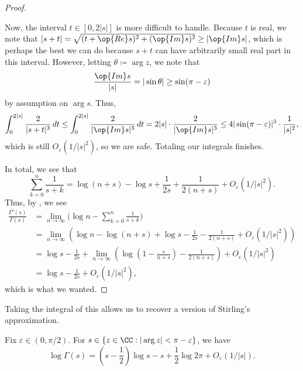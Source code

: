 \documentclass[../notes.tex]{subfiles}
\begin{document}
\begin{proof}
\begin{itemize}
		Now, the interval $t\in[0,2|s|]$ is more difficult to handle. Because $t$ is real, we note that $|s+t|=\sqrt{(t+\op{Re}s)^2+(\op{Im}s)^2}\ge|\op{Im}s|$, which is perhaps the best we can do because $s+t$ can have arbitrarily small real part in this interval. However, letting $\theta\coloneqq\arg z$, we note that
		\[\frac{\op{Im}s}{|s|}=|\sin\theta|\ge\sin(\pi-\varepsilon)\]
		by assumption on $\arg s$. Thus,
		\[\int_0^{2|s|}\frac2{|s+t|^3}\,dt\le\int_0^{2|s|}\frac2{|\op{Im}s|^3}\,dt=2|s|\cdot\frac2{|\op{Im}s|^3}\le4|\sin(\pi-\varepsilon)|^3\cdot\frac1{|s|^2},\]
		which is still $O_\varepsilon\left(1/|s|^2\right)$, so we are safe. Totaling our integrals finishes.
	\end{itemize}
	In total, we see that
	\[\sum_{k=0}^n\frac1{s+k}=\log(n+s)-\log s+\frac1{2s}+\frac1{2(n+s)}+O_\varepsilon\left(1/|s|^2\right).\]
	Thus, by , we see
	\begin{align*}
		\frac{\Gamma'(s)}{\Gamma(s)} &= \lim_{n\to\infty}\Bigg(\log n-\sum_{k=0}^n\frac1{s+k}\Bigg) \\
		&= \lim_{n\to\infty}\left(\log n-\log(n+s)+\log s-\frac1{2s}-\frac1{2(n+s)}+O_\varepsilon\left(1/|s|^2\right)\right) \\
		&= \log s-\frac1{2s}+\lim_{n\to\infty}\left(\log\left(1-\frac s{n+s}\right)-\frac1{2(n+s)}\right)+O_\varepsilon\left(1/|s|^2\right) \\
		&= \log s-\frac1{2s}+O_\varepsilon\left(1/|s|^2\right),
	\end{align*}
	which is what we wanted.
\end{proof}
Taking the integral of this allows us to recover a version of Stirling's approximation.
\begin{proposition} \label{prop:stirling}
	Fix $\varepsilon\in(0,\pi/2)$. For $s\in\{z\in\CC:|\arg z|<\pi-\varepsilon\}$, we have
	\[\log\Gamma(s)=\left(s-\frac12\right)\log s-s+\frac12\log2\pi+O_\varepsilon(1/|s|).\]
\end{proposition}
\end{document}
